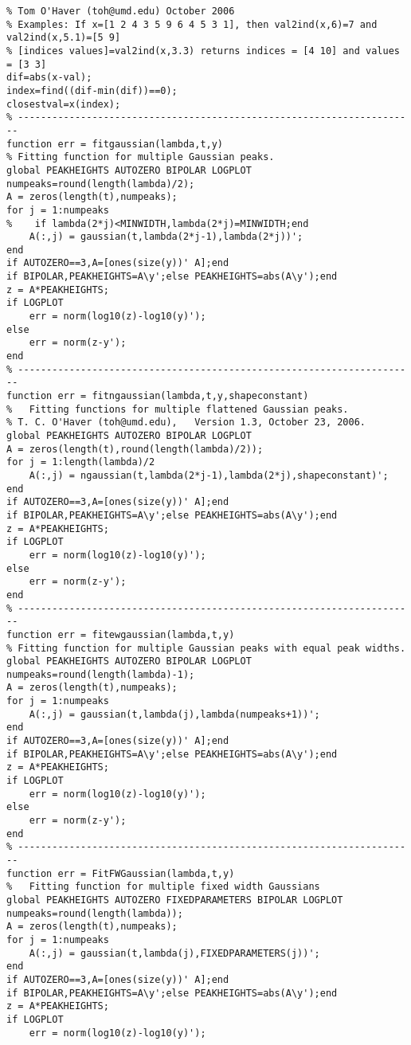 \begin{lstlisting}
% Tom O'Haver (toh@umd.edu) October 2006
% Examples: If x=[1 2 4 3 5 9 6 4 5 3 1], then val2ind(x,6)=7 and val2ind(x,5.1)=[5 9]
% [indices values]=val2ind(x,3.3) returns indices = [4 10] and values = [3 3]
dif=abs(x-val);
index=find((dif-min(dif))==0);
closestval=x(index);
% ----------------------------------------------------------------------
function err = fitgaussian(lambda,t,y)
% Fitting function for multiple Gaussian peaks.
global PEAKHEIGHTS AUTOZERO BIPOLAR LOGPLOT
numpeaks=round(length(lambda)/2);
A = zeros(length(t),numpeaks);
for j = 1:numpeaks
%    if lambda(2*j)<MINWIDTH,lambda(2*j)=MINWIDTH;end
    A(:,j) = gaussian(t,lambda(2*j-1),lambda(2*j))';
end 
if AUTOZERO==3,A=[ones(size(y))' A];end
if BIPOLAR,PEAKHEIGHTS=A\y';else PEAKHEIGHTS=abs(A\y');end
z = A*PEAKHEIGHTS;
if LOGPLOT
    err = norm(log10(z)-log10(y)');
else
    err = norm(z-y');
end
% ----------------------------------------------------------------------
function err = fitngaussian(lambda,t,y,shapeconstant)
%   Fitting functions for multiple flattened Gaussian peaks.
% T. C. O'Haver (toh@umd.edu),   Version 1.3, October 23, 2006.
global PEAKHEIGHTS AUTOZERO BIPOLAR LOGPLOT
A = zeros(length(t),round(length(lambda)/2));
for j = 1:length(lambda)/2
    A(:,j) = ngaussian(t,lambda(2*j-1),lambda(2*j),shapeconstant)';
end
if AUTOZERO==3,A=[ones(size(y))' A];end
if BIPOLAR,PEAKHEIGHTS=A\y';else PEAKHEIGHTS=abs(A\y');end
z = A*PEAKHEIGHTS;
if LOGPLOT
    err = norm(log10(z)-log10(y)');
else
    err = norm(z-y');
end
% ----------------------------------------------------------------------
function err = fitewgaussian(lambda,t,y)
% Fitting function for multiple Gaussian peaks with equal peak widths.
global PEAKHEIGHTS AUTOZERO BIPOLAR LOGPLOT
numpeaks=round(length(lambda)-1);
A = zeros(length(t),numpeaks);
for j = 1:numpeaks
    A(:,j) = gaussian(t,lambda(j),lambda(numpeaks+1))';
end
if AUTOZERO==3,A=[ones(size(y))' A];end
if BIPOLAR,PEAKHEIGHTS=A\y';else PEAKHEIGHTS=abs(A\y');end
z = A*PEAKHEIGHTS;
if LOGPLOT
    err = norm(log10(z)-log10(y)');
else
    err = norm(z-y');
end
% ----------------------------------------------------------------------
function err = FitFWGaussian(lambda,t,y)
%	Fitting function for multiple fixed width Gaussians
global PEAKHEIGHTS AUTOZERO FIXEDPARAMETERS BIPOLAR LOGPLOT
numpeaks=round(length(lambda));
A = zeros(length(t),numpeaks);
for j = 1:numpeaks
    A(:,j) = gaussian(t,lambda(j),FIXEDPARAMETERS(j))';
end
if AUTOZERO==3,A=[ones(size(y))' A];end
if BIPOLAR,PEAKHEIGHTS=A\y';else PEAKHEIGHTS=abs(A\y');end
z = A*PEAKHEIGHTS;
if LOGPLOT
    err = norm(log10(z)-log10(y)');

\end{lstlisting}
